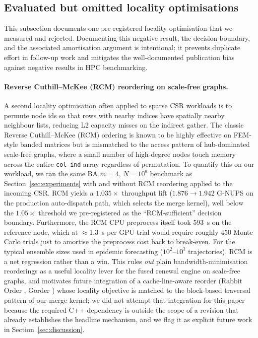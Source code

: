 \documentclass[a4paper,fleqn]{cas-sc}
\theoremstyle{definition}
\theoremstyle{remark}
\begin{document}
\subsection{Evaluated but omitted locality optimisations}
\label{sec:rejected_opts}

This subsection documents one pre-registered locality optimisation that we measured and rejected. Documenting this negative result, the decision boundary, and the associated amortisation argument is intentional; it prevents duplicate effort in follow-up work and mitigates the well-documented publication bias against negative results in HPC benchmarking.

\paragraph{Reverse Cuthill--McKee (RCM) reordering on scale-free graphs.}
A second locality optimisation often applied to sparse CSR workloads is to permute node ids so that rows with nearby indices have spatially nearby neighbour lists, reducing L2 capacity misses on the indirect gather. The classic Reverse Cuthill--McKee (RCM) ordering is known to be highly effective on FEM-style banded matrices but is mismatched to the access pattern of hub-dominated scale-free graphs, where a small number of high-degree nodes touch memory across the entire \texttt{col\_ind} array regardless of permutation. To quantify this on our workload, we ran the same BA $m{=}4$, $N = 10^6$ benchmark as Section~\ref{sec:experiments} with and without RCM reordering applied to the incoming CSR. RCM yields a $1.035\times$ throughput lift ($1.876 \to 1.942$ G-NUPS on the production auto-dispatch path, which selects the merge kernel), well below the $1.05\times$ threshold we pre-registered as the ``RCM-sufficient'' decision boundary. Furthermore, the RCM CPU preprocess itself took 593~s on the reference node, which at $\approx 1.3$~s per GPU trial would require roughly 450 Monte Carlo trials just to amortise the preprocess cost back to break-even. For the typical ensemble sizes used in epidemic forecasting ($10^2$--$10^3$ trajectories), RCM is a net regression rather than a win. This rules \emph{out} plain bandwidth-minimisation reorderings as a useful locality lever for the fused renewal engine on scale-free graphs, and motivates future integration of a cache-line-aware reorder (Rabbit Order \citep{arai2016rabbit}, Gorder \citep{wei2016gorder}) whose locality objective is matched to the block-based traversal pattern of our merge kernel; we did not attempt that integration for this paper because the required C++ dependency is outside the scope of a revision that already establishes the headline mechanism, and we flag it as explicit future work in Section~\ref{sec:discussion}.
\end{document}
